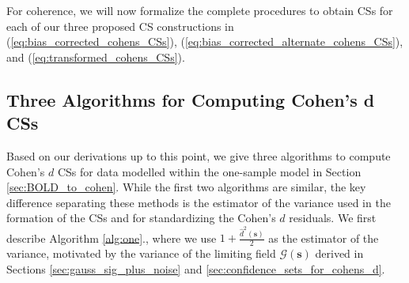 For coherence, we will now formalize the complete procedures to obtain CSs for each of our three proposed CS constructions in (\ref{eq:bias_corrected_cohens_CSs}), (\ref{eq:bias_corrected_alternate_cohens_CSs}), and (\ref{eq:transformed_cohens_CSs}).

\subsection{Three Algorithms for Computing Cohen's d CSs}
\label{sec:three_algorithms}
Based on our derivations up to this point, we give three algorithms to compute Cohen's $d$ CSs for data modelled within the one-sample model in Section \ref{sec:BOLD_to_cohen}. While the first two algorithms are similar, the key difference separating these methods is the estimator of the variance used in the formation of the CSs and for standardizing the Cohen's $d$ residuals. We first describe Algorithm \ref{alg:one}., where we use $1 + \frac{\hat{d}^{2}(\bm{s})}{2}$ as the estimator of the variance, motivated by the variance of the limiting field $\mathcal{G}(\bm{s})$ derived in Sections \ref{sec:gauss_sig_plus_noise} and \ref{sec:confidence_sets_for_cohens_d}.


